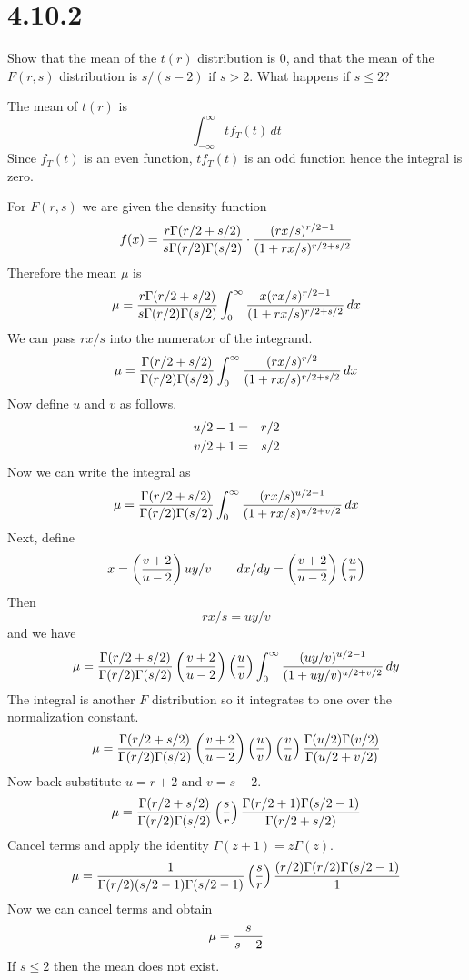 \section*{4.10.2}
Show that the mean of the $t(r)$ distribution is 0, and that the
mean of the $F(r,s)$ distribution is $s/(s-2)$ if $s>2$.
What happens if $s\le2$?

\bigskip
\noindent
The mean of $t(r)$ is
$$\int_{-\infty}^\infty t f_T(t)\,dt$$
Since $f_T(t)$ is an even function, $tf_T(t)$ is an odd function
hence the integral is zero.

\bigskip
\noindent
For $F(r,s)$ we are given the density function
$$f(x)={r\Gamma(r/2+s/2)\over s\Gamma(r/2)\Gamma(s/2)}
\cdot
{(rx/s)^{r/2-1}\over(1+rx/s)^{r/2+s/2}}
$$
Therefore the mean $\mu$ is
$$\mu={r\Gamma(r/2+s/2)\over s\Gamma(r/2)\Gamma(s/2)}
\int_0^\infty
{x(rx/s)^{r/2-1}\over(1+rx/s)^{r/2+s/2}}\,dx$$
We can pass $rx/s$ into the numerator of the integrand.
$$\mu={\Gamma(r/2+s/2)\over\Gamma(r/2)\Gamma(s/2)}
\int_0^\infty
{(rx/s)^{r/2}\over(1+rx/s)^{r/2+s/2}}\,dx$$
Now define $u$ and $v$ as follows.
\begin{eqnarray*}
u/2-1&=&r/2\cr
v/2+1&=&s/2
\end{eqnarray*}
Now we can write the integral as
$$\mu={\Gamma(r/2+s/2)\over\Gamma(r/2)\Gamma(s/2)}
\int_0^\infty
{(rx/s)^{u/2-1}\over(1+rx/s)^{u/2+v/2}}\,dx$$
Next, define
$$x=\left({v+2\over u-2}\right)uy/v
\qquad dx/dy=\left({v+2\over u-2}\right)\left({u\over v}\right)$$
Then
$$rx/s=uy/v$$
and we have
$$\mu={\Gamma(r/2+s/2)\over\Gamma(r/2)\Gamma(s/2)}
\left({v+2\over u-2}\right)\left({u\over v}\right)
\int_0^\infty
{(uy/v)^{u/2-1}\over(1+uy/v)^{u/2+v/2}}\,dy$$
The integral is another $F$ distribution so it integrates
to one over the normalization constant.
$$\mu={\Gamma(r/2+s/2)\over\Gamma(r/2)\Gamma(s/2)}
\left({v+2\over u-2}\right)\left({u\over v}\right)
\left({v\over u}\right)
{\Gamma(u/2)\Gamma(v/2)\over\Gamma(u/2+v/2)}$$
Now back-substitute $u=r+2$ and $v=s-2$.
$$\mu={\Gamma(r/2+s/2)\over\Gamma(r/2)\Gamma(s/2)}
\left({s\over r}\right)
{\Gamma(r/2+1)\Gamma(s/2-1)\over\Gamma(r/2+s/2)}$$
Cancel terms and apply the identity $\Gamma(z+1)=z\Gamma(z)$.
$$\mu={1\over\Gamma(r/2)(s/2-1)\Gamma(s/2-1)}
\left({s\over r}\right)
{(r/2)\Gamma(r/2)\Gamma(s/2-1)\over1}$$
Now we can cancel terms and obtain
$$\mu={s\over s-2}$$
If $s\le2$ then the mean does not exist.
